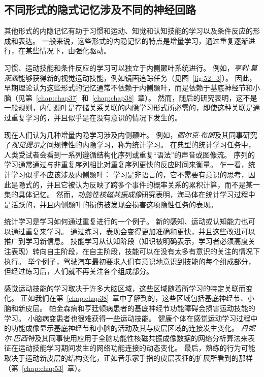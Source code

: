 \subsection{不同形式的隐式记忆涉及不同的神经回路}

其他形式的内隐记忆有助于习惯和运动、知觉和认知技能的学习以及条件反应的形成和表达。
一般来说，这些形式的内隐记忆的特点是增量学习，通过重复逐渐进行，在某些情况下，由强化驱动。


习惯、运动技能和条件反应的学习可以独立于内侧颞叶系统进行。
例如，\textit{亨利$\cdot$莫莱森}能够获得新的视觉运动技能，例如镜画追踪任务（见图~\ref{fig:52_3}）。
因此，早期理论认为这些形式的记忆通常不依赖于内侧颞叶，而是依赖于基底神经节和小脑（见第~\ref{chap:chap37}~和~\ref{chap:chap38}~章）。
然而，随后的研究表明，这不是一般规则，内侧颞叶是存储关系关联的内隐学习形式所必需的，即使这种关联是通过重复学习的，并且似乎是在没有意识的情况下发生的。


现在人们认为几种增量内隐学习涉及内侧颞叶。
例如，\textit{图尔克$\cdot$布朗}及其同事研究了\textit{视觉提示}之间规律性的内隐学习，称为统计学习。
在典型的统计学习任务中，人类受试者会看到一系列遵循结构化序列或重复“语法”的声音或图像流。
序列的学习通常通过与非重复序列相比对重复序列更快的反应时间来衡量。
乍一看，统计学习似乎不应该涉及内侧颞叶：
学习是非语言的，它不需要有意识的思考，因此是隐式的，并且它被认为反映了跨多个事件的概率关系的累积计算，而不是某一集的具体记忆。
然而，\textit{功能性核磁共振成像}研究表明，海马体在统计学习过程中是活跃的，并且内侧颞叶的损伤被发现会损害这项隐性任务的表现。


统计学习是学习如何通过重复进行的一个例子。
新的感知、运动或认知能力也可以通过重复来学习。
通过练习，表现会变得更加准确和更快，并且这些改进可以推广到学习新信息。
技能学习从认知阶段（知识被明确表示，学习者必须高度关注表现）转向自主阶段，在自主阶段，技能可以在没有太多有意识的关注的情况下执行。
举个例子，驾驶汽车最初要求人们有意识地意识到技能的每个组成部分，但经过练习后，人们就不再关注各个组成部分。


感觉运动技能的学习取决于许多大脑区域，这些区域随着所学习的特定关联而变化。
正如我们在第~\ref{chap:chap38}~章中了解到的，这些区域包括基底神经节、小脑和新皮层。
帕金森病和亨廷顿病患者的基底神经节功能障碍会损害运动技能的学习。
小脑病变患者也很难获得一些运动技能。
健康个体在感觉运动学习过程中的功能成像显示基底神经节和小脑的活动及其与皮层区域的连接发生变化。
\textit{丹妮尔$\cdot$巴西特}及其同事使用应用于全脑功能性核磁共振成像数据的网络分析算法来表征在运动技能学习期间发生的网络功能连接的动态变化。
最后，熟练的行为可能取决于运动新皮层的结构变化，正如音乐家手指的皮层表征的扩展所看到的那样（第~\ref{chap:chap53}~章）。


